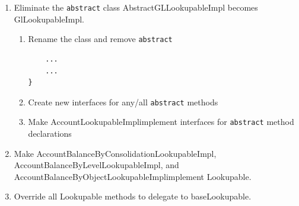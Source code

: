 \documentclass[12pt,notitlepage]{article}
\begin{document}
\begin{s5presentation}
      \begin{tex}
      \begin{enumerate}
        \item Eliminate the \texttt{abstract} class
          \sf AbstractGLLookupableImpl \rm becomes \sf GlLookupableImpl\rm.
          \begin{enumerate}
            \item Rename the class and remove \texttt{abstract}
              
              \begin{lstlisting}
    ...
    ...
}
              \end{lstlisting}
            \item Create new interfaces for any/all \texttt{abstract} methods
              
              
            \item Make \sf AccountLookupableImpl\rm implement interfaces for \texttt{abstract} method declarations
              
          \end{enumerate}
          \item Make \sf AccountBalanceByConsolidationLookupableImpl, AccountBalanceByLevelLookupableImpl, \rm and \sf 
      AccountBalanceByObjectLookupableImpl\rm implement \sf Lookupable. \rm
      \begin{figure}
        
        
        
      \end{figure}
      
      \item Override all \sf Lookupable \rm methods to delegate to \sf baseLookupable\rm.
      \end{enumerate}
  \end{tex}
  

\end{s5presentation}
\end{document}
